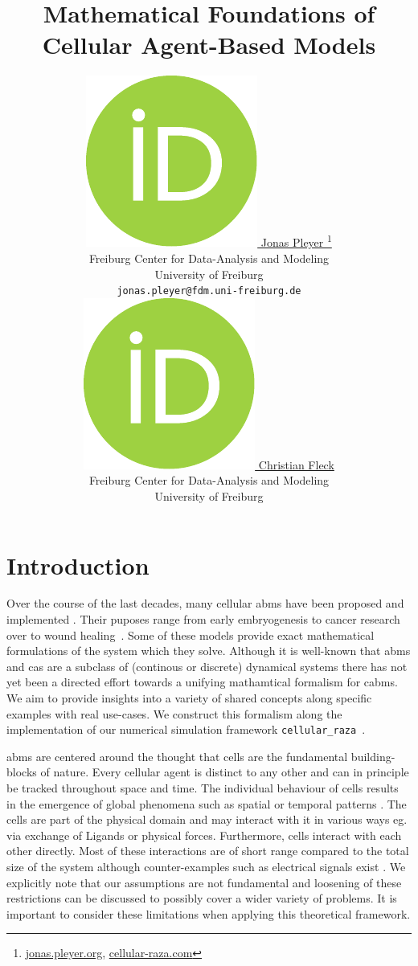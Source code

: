 \documentclass{article}
\title{
    Mathematical Foundations of\\
    Cellular Agent-Based Models
}
\author{
    \href{https://orcid.org/0009-0001-0613-7978}{
        \includegraphics[scale=0.06]{orcid.pdf}
        \hspace{1mm}Jonas Pleyer
    }
    \thanks{
        \href{https://jonas.pleyer.org}{jonas.pleyer.org},
        \href{https://cellular-raza.com}{cellular-raza.com}
    }\\
	Freiburg Center for Data-Analysis and Modeling\\
	University of Freiburg\\
	\texttt{jonas.pleyer@fdm.uni-freiburg.de} \\
	\And
	\href{https://orcid.org/0000-0002-6371-4495}{
        \includegraphics[scale=0.06]{orcid.pdf}
        \hspace{1mm}Christian Fleck
    }\\
	Freiburg Center for Data-Analysis and Modeling\\
	University of Freiburg
}
\begin{document}
\maketitle

\begin{abstract}
\end{abstract}



\section{Introduction}
\label{section:introduction}
Over the course of the last decades, many cellular \acp{abm} have been proposed and implemented
\cite{PoncedeLeon2022,Hoehme2010,Lupperger2020}.
Their puposes range from early embryogenesis to cancer research over to wound
healing~\cite{Ziraldo2013}.
Some of these models provide exact mathematical formulations \cite{Ghaffarizadeh2018,Tanaka2015} of
the system which they solve.
Although it is well-known that \acp{abm} and \acp{ca} are a subclass of (continous or discrete)
dynamical systems \cite{Wolfram1984} there has not yet been a directed effort towards a unifying
mathamtical formalism for \acp{cabm}.
We aim to provide insights into a variety of shared concepts along specific examples with real
use-cases.
We construct this formalism along the implementation of our numerical simulation framework
\lstinline{cellular_raza}~\cite{Pleyer_cellular_raza_2024}.

\acp{abm} are centered around the thought that cells are the fundamental building-blocks of nature.
Every cellular agent is distinct to any other and can in principle be tracked throughout space and
time.
The individual behaviour of cells results in the emergence of global phenomena such as spatial or
temporal patterns \cite{Owen2020,Wolpert1969,Giudicelli2007}.
The cells are part of the physical domain and may interact with it in various ways eg. via exchange
of Ligands or physical forces.
Furthermore, cells interact with each other directly.
Most of these interactions are of short range compared to the total size of the system although
counter-examples such as electrical signals exist \cite{Ded2021}.
We explicitly note that our assumptions are not fundamental and loosening of these restrictions can
be discussed to possibly cover a wider variety of problems.
It is important to consider these limitations when applying this theoretical framework.
\end{document}
